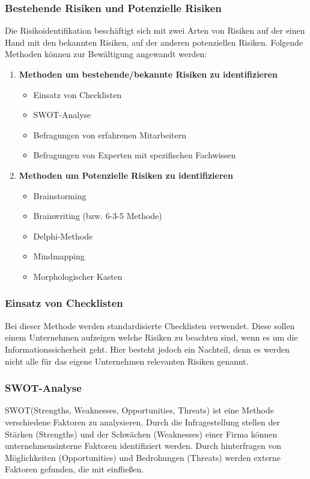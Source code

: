 \subsubsection{Bestehende Risiken und Potenzielle Risiken}
Die Risikoidentifikation beschäftigt sich mit zwei Arten von Risiken auf der einen Hand mit den bekannten Risiken, auf der anderen potenziellen Risiken. Folgende Methoden können zur Bewältigung angewandt werden:
\begin{enumerate}
    \item \textbf{Methoden um bestehende/bekannte Risiken zu identifizieren}
    \begin{itemize}
        \item Einsatz von Checklisten
        \item SWOT-Analyse
        \item Befragungen von erfahrenen Mitarbeitern
        \item Befragungen von Experten mit spezifischen Fachwissen
    \end{itemize}
    \item \textbf{Methoden um Potenzielle Risiken zu identifizieren}
    \begin{itemize}
    	\item Brainstorming
    	\item Brainwriting (bzw. 6-3-5 Methode)
    	\item Delphi-Methode
    	\item Mindmapping
    	\item Morphologischer Kasten
    \end{itemize}
\end{enumerate}

\subsubsection{Einsatz von Checklisten}
Bei dieser Methode werden standardisierte Checklisten verwendet. Diese sollen einem Unternehmen aufzeigen welche Risiken zu beachten sind, wenn es um die Informationssicherheit geht. Hier besteht jedoch ein Nachteil, denn es werden nicht alle für das eigene Unternehmen relevanten Risiken genannt.

\subsubsection{SWOT-Analyse}
SWOT(Strengths, Weaknesses, Opportunities, Threats) ist eine Methode verschiedene Faktoren zu analysieren. 
Durch die Infragestellung stellen der Stärken (Strengths) und der Schwächen (Weaknesses) einer Firma können unternehmensinterne Faktoren identifiziert werden.
Durch hinterfragen von Möglichkeiten (Opportunities) und Bedrohungen (Threats) werden externe Faktoren gefunden, die mit einfließen.


